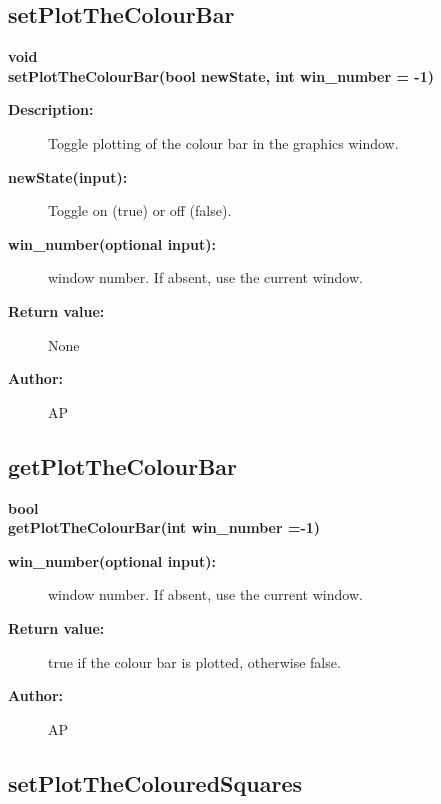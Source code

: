 \subsection{setPlotTheColourBar}
 
\begin{flushleft} \textbf{%
void  \\ 
\settowidth{\GLGraphicsInterfaceIncludeArgIndent}{setPlotTheColourBar(}%
setPlotTheColourBar(bool newState, int win\_number  = -1) 
}\end{flushleft}
\begin{description}
\item[{\bf Description:}] 
 Toggle plotting of the colour bar in the graphics window.
\item[{\bf newState(input):}]  Toggle on (true) or off (false).
\item[{\bf win\_number(optional input):}]  window number. If absent, use the current window.

\item[{\bf Return value:}]  None
\item[{\bf Author:}]  AP
\end{description}
\subsection{getPlotTheColourBar}
 
\begin{flushleft} \textbf{%
bool  \\ 
\settowidth{\GLGraphicsInterfaceIncludeArgIndent}{getPlotTheColourBar(}%
getPlotTheColourBar(int win\_number  =-1)
}\end{flushleft}
\begin{description}
\item[{\bf win\_number(optional input):}]  window number. If absent, use the current window.

\item[{\bf Return value:}]  true if the colour bar is plotted, otherwise false.
\item[{\bf Author:}]  AP
\end{description}
\subsection{setPlotTheColouredSquares}
 
